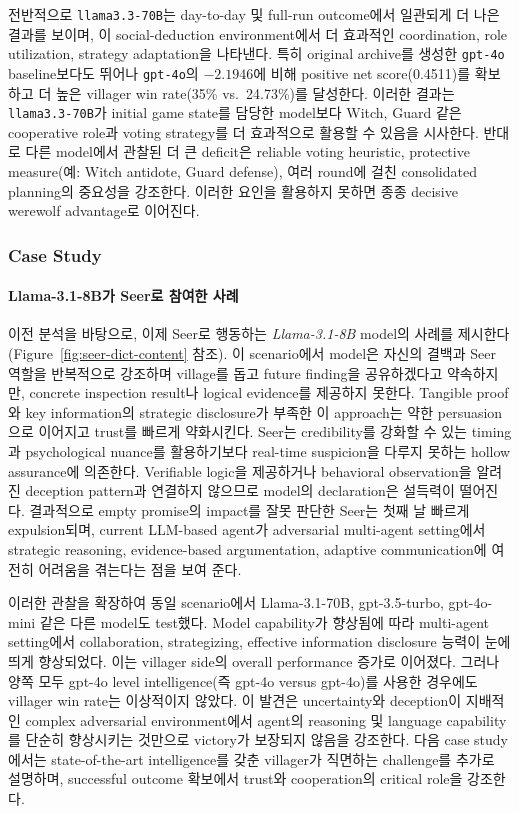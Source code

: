 전반적으로 \texttt{llama3.3-70B}는 day-to-day 및 full-run outcome에서 일관되게 더 나은 결과를 보이며, 이 social-deduction environment에서 더 효과적인 coordination, role utilization, strategy adaptation을 나타낸다. 특히 original archive를 생성한 \texttt{gpt-4o} baseline보다도 뛰어나 \texttt{gpt-4o}의 $-2.1946$에 비해 positive net score(0.4511)를 확보하고 더 높은 villager win rate(35\% vs.\ 24.73\%)를 달성한다. 이러한 결과는 \texttt{llama3.3-70B}가 initial game state를 담당한 model보다 Witch, Guard 같은 cooperative role과 voting strategy를 더 효과적으로 활용할 수 있음을 시사한다. 반대로 다른 model에서 관찰된 더 큰 deficit은 reliable voting heuristic, protective measure(예: Witch antidote, Guard defense), 여러 round에 걸친 consolidated planning의 중요성을 강조한다. 이러한 요인을 활용하지 못하면 종종 decisive werewolf advantage로 이어진다.
\subsubsection{Case Study}
\label{sec:detailed-results-case-study}
\paragraph{Llama-3.1-8B가 Seer로 참여한 사례}
\label{appendix:case1}
이전 분석을 바탕으로, 이제 Seer로 행동하는 \textit{Llama-3.1-8B} model의 사례를 제시한다(Figure~\ref{fig:seer-dict-content} 참조). 이 scenario에서 model은 자신의 결백과 Seer 역할을 반복적으로 강조하며 village를 돕고 future finding을 공유하겠다고 약속하지만, concrete inspection result나 logical evidence를 제공하지 못한다. Tangible proof와 key information의 strategic disclosure가 부족한 이 approach는 약한 persuasion으로 이어지고 trust를 빠르게 약화시킨다. Seer는 credibility를 강화할 수 있는 timing과 psychological nuance를 활용하기보다 real-time suspicion을 다루지 못하는 hollow assurance에 의존한다. Verifiable logic을 제공하거나 behavioral observation을 알려진 deception pattern과 연결하지 않으므로 model의 declaration은 설득력이 떨어진다. 결과적으로 empty promise의 impact를 잘못 판단한 Seer는 첫째 날 빠르게 expulsion되며, current LLM-based agent가 adversarial multi-agent setting에서 strategic reasoning, evidence-based argumentation, adaptive communication에 여전히 어려움을 겪는다는 점을 보여 준다.

이러한 관찰을 확장하여 동일 scenario에서 Llama-3.1-70B, gpt-3.5-turbo, gpt-4o-mini 같은 다른 model도 test했다. Model capability가 향상됨에 따라 multi-agent setting에서 collaboration, strategizing, effective information disclosure 능력이 눈에 띄게 향상되었다. 이는 villager side의 overall performance 증가로 이어졌다. 그러나 양쪽 모두 gpt-4o level intelligence(즉 gpt-4o versus gpt-4o)를 사용한 경우에도 villager win rate는 이상적이지 않았다. 이 발견은 uncertainty와 deception이 지배적인 complex adversarial environment에서 agent의 reasoning 및 language capability를 단순히 향상시키는 것만으로 victory가 보장되지 않음을 강조한다. 다음 case study에서는 state-of-the-art intelligence를 갖춘 villager가 직면하는 challenge를 추가로 설명하며, successful outcome 확보에서 trust와 cooperation의 critical role을 강조한다.

